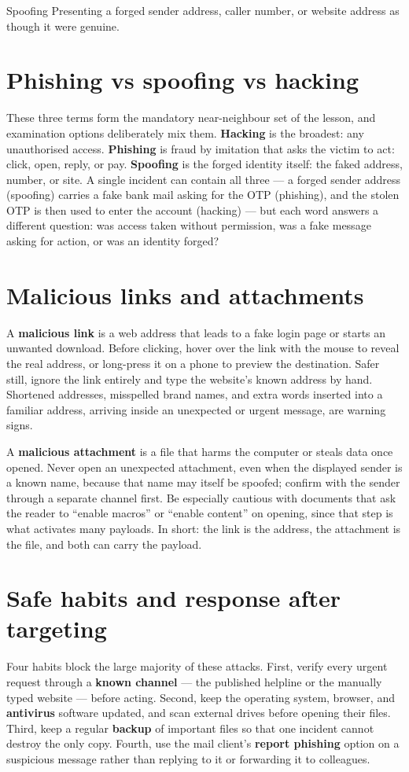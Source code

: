 \begin{definitionbox}{Spoofing}
Presenting a forged sender address, caller number, or website address
as though it were genuine.
\end{definitionbox}

\section{Phishing vs spoofing vs hacking}
These three terms form the mandatory near-neighbour set of the lesson,
and examination options deliberately mix them. \textbf{Hacking} is the
broadest: any unauthorised access. \textbf{Phishing} is fraud by
imitation that asks the victim to act: click, open, reply, or pay.
\textbf{Spoofing} is the forged identity itself: the faked address,
number, or site. A single incident can contain all three --- a forged
sender address (spoofing) carries a fake bank mail asking for the OTP
(phishing), and the stolen OTP is then used to enter the account
(hacking) --- but each word answers a different question: was access
taken without permission, was a fake message asking for action, or was
an identity forged?

\section{Malicious links and attachments}
A \textbf{malicious link} is a web address that leads to a fake login
page or starts an unwanted download. Before clicking, hover over the
link with the mouse to reveal the real address, or long-press it on a
phone to preview the destination. Safer still, ignore the link entirely
and type the website's known address by hand. Shortened addresses,
misspelled brand names, and extra words inserted into a familiar
address, arriving inside an unexpected or urgent message, are warning
signs.

A \textbf{malicious attachment} is a file that harms the computer or
steals data once opened. Never open an unexpected attachment, even when
the displayed sender is a known name, because that name may itself be
spoofed; confirm with the sender through a separate channel first. Be
especially cautious with documents that ask the reader to ``enable
macros'' or ``enable content'' on opening, since that step is what
activates many payloads. In short: the link is the address, the
attachment is the file, and both can carry the payload.

\section{Safe habits and response after targeting}
Four habits block the large majority of these attacks. First, verify
every urgent request through a \textbf{known channel} --- the published
helpline or the manually typed website --- before acting. Second, keep
the operating system, browser, and \textbf{antivirus} software updated,
and scan external drives before opening their files. Third, keep a
regular \textbf{backup} of important files so that one incident cannot
destroy the only copy. Fourth, use the mail client's \textbf{report
phishing} option on a suspicious message rather than replying to it or
forwarding it to colleagues.

